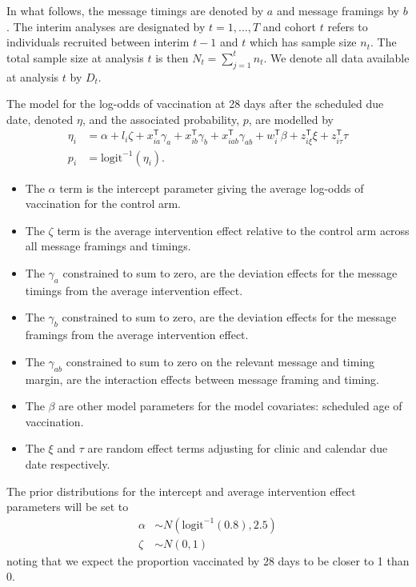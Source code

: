 \documentclass[
  bibliography=totoc]{scrreprt}
\providecommand{\tightlist}{%
  \setlength{\itemsep}{0pt}\setlength{\parskip}{0pt}}
\begin{document}
In what follows, the message timings are denoted by \(a\) and message framings by \(b\).
The interim analyses are designated by \(t=1,...,T\) and cohort \(t\) refers to individuals recruited between interim \(t-1\) and \(t\) which has sample size \(n_t\).
The total sample size at analysis \(t\) is then \(N_t = \sum_{j=1}^t n_t\).
We denote all data available at analysis \(t\) by \(D_t\).

The model for the log-odds of vaccination at 28 days after the scheduled due date, denoted \(\eta\), and the associated probability, \(p\), are modelled by
\[
\begin{aligned}
\eta_i &= \alpha + l_i\zeta + x_{ia}^\mathsf{T}\gamma_a + x_{ib}^\mathsf{T}\gamma_b + x_{iab}^\mathsf{T}\gamma_{ab} + w_i^\mathsf{T}\beta + z_{i\xi}^\mathsf{T}\xi + z_{i\tau}^{\mathsf{T}}\tau\\
p_i &= \text{logit}^{-1}(\eta_i).
\end{aligned}
\]

\begin{itemize}
\tightlist
\item
  The \(\alpha\) term is the intercept parameter giving the average log-odds of vaccination for the control arm.
\item
  The \(\zeta\) term is the average intervention effect relative to the control arm across all message framings and timings.
\item
  The \(\gamma_a\) constrained to sum to zero, are the deviation effects for the message timings from the average intervention effect.
\item
  The \(\gamma_b\) constrained to sum to zero, are the deviation effects for the message framings from the average intervention effect.
\item
  The \(\gamma_{ab}\) constrained to sum to zero on the relevant message and timing margin, are the interaction effects between message framing and timing.
\item
  The \(\beta\) are other model parameters for the model covariates: scheduled age of vaccination.
\item
  The \(\xi\) and \(\tau\) are random effect terms adjusting for clinic and calendar due date respectively.
\end{itemize}

The prior distributions for the intercept and average intervention effect parameters will be set to
\[
\begin{aligned}
\alpha &\sim N(\text{logit}^{-1}(0.8), 2.5) \\
\zeta &\sim N(0, 1)
\end{aligned}
\]
noting that we expect the proportion vaccinated by 28 days to be closer to 1 than 0.
\end{document}
